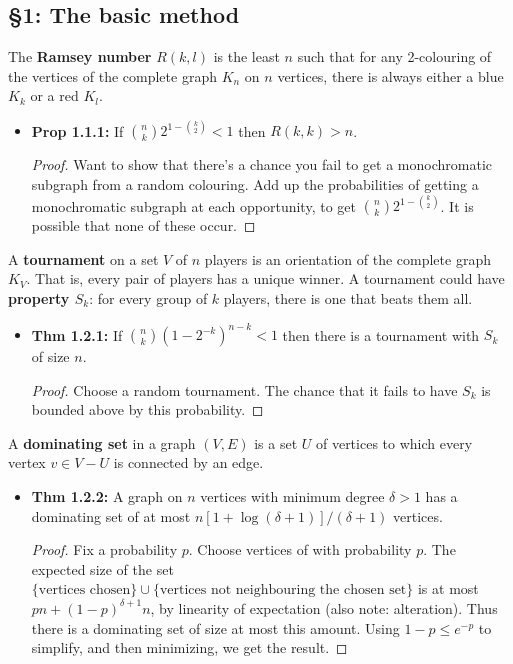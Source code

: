 \documentclass[11pt]{article}
\newenvironment{INT}[1][]{\begin{itemize}\small\item\textbf{#1}}{\end{itemize}}
\begin{document}
\begin{chapter1}
\section*{\S1: The basic method}
\begin{itemise}
\item The \textbf{Ramsey number} $R(k,l)$ is the least $n$ such that for any 2-colouring of the vertices of the complete graph $K_n$ on $n$ vertices, there is always either a blue $K_k$ or a red $K_l$.
\begin{INT}[Prop 1.1.1:]
If ${n\choose k}2^{1-{k\choose 2}}<1$ then $R(k,k)>n$.
\begin{proof}
Want to show that there's a chance you fail to get a monochromatic subgraph from a random colouring. Add up the probabilities of getting a monochromatic subgraph at each opportunity, to get ${n\choose k}2^{1-{k\choose 2}}$. It is possible that none of these occur.
\end{proof}
\end{INT}
\item A \textbf{tournament} on a set $V$ of $n$ players is an orientation of the complete graph $K_V$. That is, every pair of players has a unique winner.
A tournament could have \textbf{property $S_k$}: for every group of $k$ players, there is one that beats them all.
\begin{INT}[Thm 1.2.1:]
If ${n\choose k}(1-2^{-k})^{n-k}<1$ then there is a tournament with $S_k$ of size $n$.
\begin{proof}
Choose a random tournament. The chance that it fails to have $S_k$ is bounded above by this probability.
\end{proof}
\end{INT}
\item A \textbf{dominating set} in a graph $(V,E)$ is a set $U$ of vertices to which every vertex $v\in V-U$ is connected by an edge.
\begin{INT}[Thm 1.2.2:]
A graph on $n$ vertices with minimum degree $\delta>1$ has a dominating set of at most $n[1+\log(\delta+1)]/(\delta+1)$ vertices.
\begin{proof}
Fix a probability $p$. Choose vertices of with probability $p$. The expected size of the set $\{\text{vertices chosen}\}\cup\{\text{vertices not neighbouring the chosen set}\}$ is at most $pn+(1-p)^{\delta+1}n$, by linearity of expectation (also note: alteration). Thus there is a dominating set of size at most this amount. Using $1-p\leq e^{-p}$ to simplify, and then minimizing, we get the result.

\end{proof}
\end{INT}
\end{itemise}
\end{chapter1}
\end{document}
